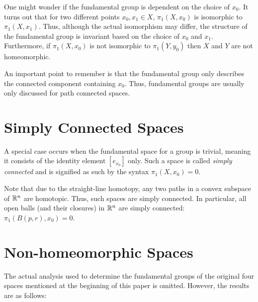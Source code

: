 \documentclass[letterpaper,12pt,fleqn]{article}
\begin{document}
One might wonder if the fundamental group is dependent on the choice of \(x_0\).  It turns out that for two
different points \(x_0,x_1\in X\), \(\pi_1(X,x_0)\) is isomorphic to \(\pi_1(X,x_1)\).  Thus, although the actual
isomorphism may differ, the structure of the fundamental group is invariant based on the choice of \(x_0\) and
\(x_1\).  Furthermore, if \(\pi_1(X,x_0)\) is not isomorphic to \(\pi_1(Y,y_0)\) then \(X\) and \(Y\) are not
homeomorphic.

An important point to remember is that the fundamental group only describes the connected component containing
\(x_0\).  Thus, fundamental groups are usually only discussed for path connected spaces.

\section*{Simply Connected Spaces}

A special case occurs when the fundamental space for a group is trivial, meaning it consists of the identity
element \([e_{x_0}]\) only.  Such a space is called \emph{simply connected} and is signified as such by the
syntax \(\pi_1(X,x_0)=0\).

Note that due to the straight-line homotopy, any two paths in a convex subspace of \(\mathbb{R}^n\) are homotopic.  Thus,
such spaces are simply connected.  In particular, all open balls (and their closures) in \(\mathbb{R}^n\) are simply
connected: \(\pi_1(B(p,r),x_0)=0\).

\section*{Non-homeomorphic Spaces}

The actual analysis used to determine the fundamental groups of the original four spaces mentioned at the beginning
of this paper is omitted.  However, the results are as follows:
\end{document}
